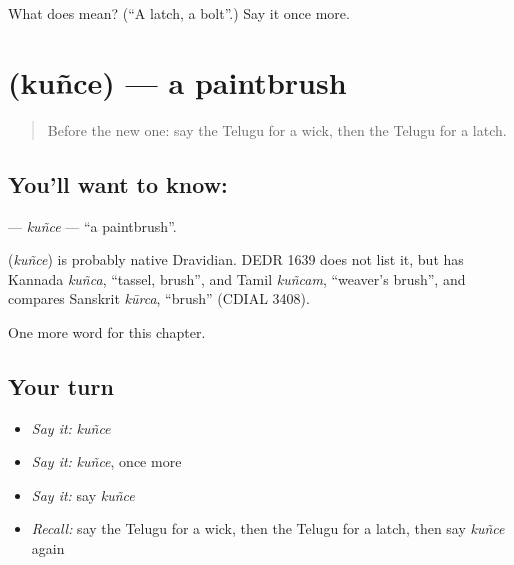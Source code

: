 \begin{tcolorbox}[breakable,colback=teal!4,colframe=teal!35!black,title={Before you move on}]
What does  mean? (\textquotedblleft{}A latch, a bolt\textquotedblright{}.) Say it once more.
\end{tcolorbox}
\section[\texorpdfstring{\te{కుంచె} (kuñce)}{కుంచె (kuñce)}]{ (kuñce) — a paintbrush}

\label{lesson:TE-C192-kunce}



\begin{quote}
Before the new one: say the Telugu for a wick, then the Telugu for a latch.
\end{quote}

\subsection*{You'll want to know: }
\textbf{} — \emph{kuñce} — \textquotedblleft{}a paintbrush\textquotedblright{}.

\begin{cousinweb}
\textbf{} (\emph{kuñce}) is probably native Dravidian. DEDR 1639 does not list it, but has Kannada \emph{kuñca}, \textquotedblleft{}tassel, brush\textquotedblright{}, and Tamil \emph{kuñcam}, \textquotedblleft{}weaver's brush\textquotedblright{}, and compares Sanskrit \emph{kūrca}, \textquotedblleft{}brush\textquotedblright{} (CDIAL 3408).
\end{cousinweb}

\begin{grammarlens}[title={What you've built}]
One more word for this chapter.
\end{grammarlens}

\subsection*{Your turn}
\begin{itemize}
\raggedright
  \item \emph{Say it:} \emph{kuñce}
  \item \emph{Say it:} \emph{kuñce}, once more
  \item \emph{Say it:} say \emph{kuñce}
  \item \emph{Recall:} say the Telugu for a wick, then the Telugu for a latch, then say \emph{kuñce} again
\end{itemize}

